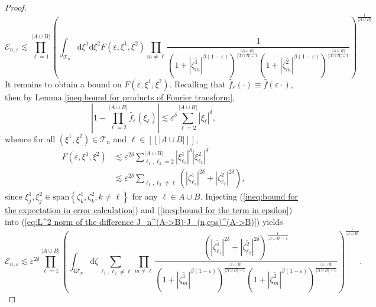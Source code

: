 \documentclass[12pt]{article}
\newcommand{\1}{\mathds{1}}
\renewcommand{\d}{\mathrm d}
\numberwithin{equation}{section}
\begin{document}
\begin{proof}
    \begin{equation*}
        \mathcal E_{n,\varepsilon}\lesssim\prod_{\ell=1}^{|A\cup B|}\left(\int_{\mathcal T_n}\d\xi^1\d\xi^2 F(\varepsilon,\xi^1,\xi^2)\prod_{m\ne \ell}\frac{1}{\left(1+|\overline{\zeta_m^1}|^{\beta(1-\varepsilon)}\right)^{\frac{|A\cup B|}{|A\cup B|-1}}\left(1+|\overline{\zeta_m^2}|^{\beta(1-\varepsilon)}\right)^\frac{|A\cup B|}{|A\cup B|-1}}\right)^{\frac{1}{|A\cup B|}}
    \end{equation*}
    It remains to obtain a bound on $F(\varepsilon,\xi^1,\xi^2)$. Recalling that $\hat f_\varepsilon(\cdot)\equiv\hat f(\varepsilon\cdot)$, then by Lemma \ref{ineq:bound for products of Fourier transform},
    \begin{equation*}
        \left|1-\prod_{\ell=2}^{|A\cup B|}\hat f_{\varepsilon}\left(\xi_\ell\right)\right|\lesssim \varepsilon^\delta\sum_{\ell=2}^{|A\cup B|}|\xi_\ell|^\delta,
    \end{equation*}
    whence for all $(\xi^1,\xi^2)\in\mathcal T_n$ and $\ell\in[\![|A\cup B|]\!]$,
    \begin{align}
    \label{ineq:bound for the term in epsilon}
        F(\varepsilon,\xi^1,\xi^2)&\lesssim\varepsilon^{2\delta}\sum_{\ell_1,\ell_2=2}^{|A\cup B|}|\xi_{\ell_1}^1|^\delta|\xi_{\ell_2}^2|^\delta\nonumber\\
        &\lesssim\varepsilon^{2\delta}\sum_{\ell_1,\ell_2\ne \ell}\left(|\zeta_{\ell_1}^1|^{2\delta}+|\zeta_{\ell_2}^2|^{2\delta}\right),
    \end{align}
    since $\xi_j^1,\xi_j^2\in\mathrm{span}\left\{\zeta_k^1,\zeta_k^2, k\ne \ell\right\}$ for any $\ell\in A\cup B$. Injecting (\ref{ineq:bound for the expectation in error calculation}) and (\ref{ineq:bound for the term in epsilon}) into (\ref{eq:L^2 norm of the difference J_n^(A->B)-J_(n,eps)^(A->B)}) yields
    \begin{equation}
    \label{ineq:final bound for E_(n,varepsilon)}
        \mathcal E_{n,\varepsilon}\lesssim \varepsilon^{2\delta}\prod_{\ell=1}^{|A\cup B|}\left(\int_{4\mathcal T_n}\d\zeta \sum_{\ell_1,\ell_2\ne \ell}\prod_{m\ne \ell}\frac{\left(|\overline{\zeta_{\ell_1}^1}|^{2\delta}+|\overline{\zeta_{\ell_2}^2}|^{2\delta}\right)^{\frac{1}{|A\cup B|-1}}}{\left(1+|\overline{\zeta_m^1}|^{\beta(1-\varepsilon)}\right)^{\frac{|A\cup B|}{|A\cup B|-1}}\left(1+|\overline{\zeta_m^2}|^{\beta(1-\varepsilon)}\right)^\frac{|A\cup B|}{|A\cup B|-1}}\right)^{\frac{1}{|A\cup B|}}.
    \end{equation}
    

\end{proof}
\end{document}
